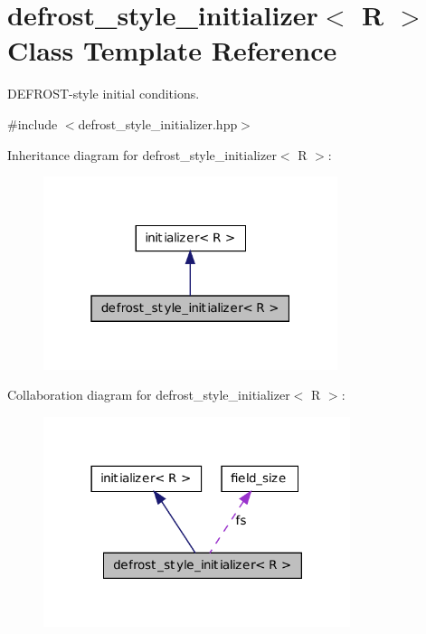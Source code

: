 \hypertarget{classdefrost__style__initializer}{
\section{defrost\_\-style\_\-initializer$<$ R $>$ Class Template Reference}
\label{classdefrost__style__initializer}
}


DEFROST-\/style initial conditions.  




{\ttfamily \#include $<$defrost\_\-style\_\-initializer.hpp$>$}



Inheritance diagram for defrost\_\-style\_\-initializer$<$ R $>$:
\nopagebreak
\begin{figure}[H]
\begin{center}
\leavevmode
\includegraphics[width=244pt]{classdefrost__style__initializer__inherit__graph}
\end{center}
\end{figure}


Collaboration diagram for defrost\_\-style\_\-initializer$<$ R $>$:
\nopagebreak
\begin{figure}[H]
\begin{center}
\leavevmode
\includegraphics[width=254pt]{classdefrost__style__initializer__coll__graph}
\end{center}
\end{figure}
